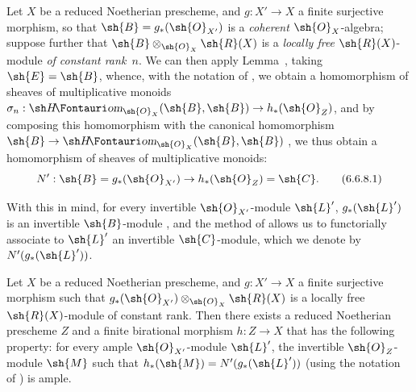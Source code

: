 \begin{env}[6.6.8]
\label{II.6.6.8}
Let $X$ be a reduced Noetherian prescheme, and $g:X'\to X$ a finite surjective morphism, so that $\sh{B}=g_*(\sh{O}_{X'})$ is a \emph{coherent} $\sh{O}_X$-algebra;
suppose further that $\sh{B}\otimes_{\sh{O}_X}\sh{R}(X)$ is a \emph{locally free} $\sh{R}(X)$-module \emph{of constant rank~$n$}.
We can then apply Lemma~, taking $\sh{E}=\sh{B}$, whence, with the notation of , we obtain a homomorphism of sheaves of multiplicative monoids $\sigma_n:\shHom_{\sh{O}_X}(\sh{B},\sh{B})\to h_*(\sh{O}_Z)$, and by composing this homomorphism with the canonical homomorphism $\sh{B}\to\shHom_{\sh{O}_X}(\sh{B},\sh{B})$ , we thus obtain a homomorphism of sheaves of multiplicative monoids:
\[
\label{II.6.6.8.1}
  N' : \sh{B} = g_*(\sh{O}_{X'}) \to h_*(\sh{O}_Z) = \sh{C}.
\tag{6.6.8.1}
\]

With this in mind, for every invertible $\sh{O}_{X'}$-module $\sh{L}'$, $g_*(\sh{L}')$ is an invertible $\sh{B}$-module , and the method of  allows us to functorially associate to $\sh{L}'$ an invertible $\sh{C}$-module, which we denote by $N'(g_*(\sh{L}'))$.
\end{env}

\begin{lemma}[6.6.9]
\label{II.6.6.9}
Let $X$ be a reduced Noetherian prescheme, and $g:X'\to X$ a finite surjective morphism such that $g_*(\sh{O}_{X'})\otimes_{\sh{O}_X}\sh{R}(X)$ is a locally free $\sh{R}(X)$-module of constant rank.
Then there exists a reduced Noetherian prescheme $Z$ and a finite birational morphism $h:Z\to X$ that has the following property: for every ample $\sh{O}_{X'}$-module $\sh{L}'$, the invertible $\sh{O}_Z$-module $\sh{M}$ such that $h_*(\sh{M})=N'(g_*(\sh{L}'))$ (using the notation of ) is ample.
\end{lemma}

